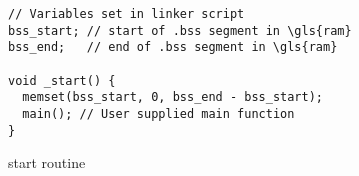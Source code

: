 \begin{listing}[H]
\begin{verbatim}
// Variables set in linker script
bss_start; // start of .bss segment in \gls{ram}
bss_end;   // end of .bss segment in \gls{ram}

void _start() {
  memset(bss_start, 0, bss_end - bss_start);
  main(); // User supplied main function
}
\end{verbatim}
\caption{start routine}
\label{lst:start}
\end{listing}
